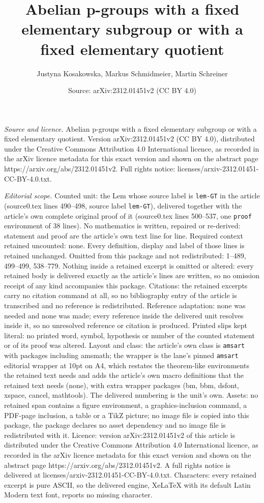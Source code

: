 \documentclass[10pt,a4paper]{amsart}
\title[Abelian p-groups with a fixed elementary subgroup or with a ]{Abelian p-groups with a fixed elementary subgroup or with a fixed elementary quotient}
\author{Justyna Kosakowska, Markus Schmidmeier, Martin Schreiner}
\date{Source: arXiv:2312.01451v2 (CC BY 4.0)}
\begin{document}
\maketitle

\noindent\emph{Source and licence.} Abelian p-groups with a fixed elementary subgroup or with a fixed elementary quotient. Version arXiv:2312.01451v2 (CC BY 4.0), distributed under the Creative Commons Attribution 4.0 International licence, as recorded in the arXiv licence metadata for this exact version and shown on the abstract page https://arxiv.org/abs/2312.01451v2. Full rights notice: licenses/arxiv-2312.01451-CC-BY-4.0.txt.\par\smallskip

\noindent\textit{Editorial scope.} Counted unit: the Lem whose source label is \texttt{lem-GT} in the article (source0.tex lines 490--498, source label \texttt{lem-GT}), delivered together with the article's own complete original proof of it (source0.tex lines 500--537, one \texttt{proof} environment of 38 lines). No mathematics is written, repaired or re-derived: statement and proof are the article's own text line for line. Required context retained uncounted: none. Every definition, display and label of those lines is retained unchanged. Omitted from this package and not redistributed: 1--489, 499--499, 538--779. Nothing inside a retained excerpt is omitted or altered: every retained body is delivered exactly as the article's lines are written, so no omission receipt of any kind accompanies this package. Citations: the retained excerpts carry no citation command at all, so no bibliography entry of the article is transcribed and no reference is redistributed. Reference adaptation: none was needed and none was made; every reference inside the delivered unit resolves inside it, so no unresolved reference or citation is produced. Printed slips kept literal: no printed word, symbol, hypothesis or number of the counted statement or of its proof was altered. Layout and class: the article's own class is \texttt{amsart} with packages including amsmath; the wrapper is the lane's pinned \texttt{amsart} editorial wrapper at 10pt on A4, which restates the theorem-like environments the retained text needs and adds the article's own macro definitions that the retained text needs (none), with extra wrapper packages (bm, bbm, dsfont, xspace, cancel, mathtools). The delivered numbering is the unit's own. Assets: no retained span contains a figure environment, a graphics-inclusion command, a PDF-page inclusion, a table or a TikZ picture; no image file is copied into this package, the package declares no asset dependency and no image file is redistributed with it. Licence: version arXiv:2312.01451v2 of this article is distributed under the Creative Commons Attribution 4.0 International licence, as recorded in the arXiv licence metadata for this exact version and shown on the abstract page https://arxiv.org/abs/2312.01451v2. A full rights notice is delivered at licenses/arxiv-2312.01451-CC-BY-4.0.txt. Characters: every retained excerpt is pure ASCII, so the delivered engine, XeLaTeX with its default Latin Modern text font, reports no missing character.
\end{document}
